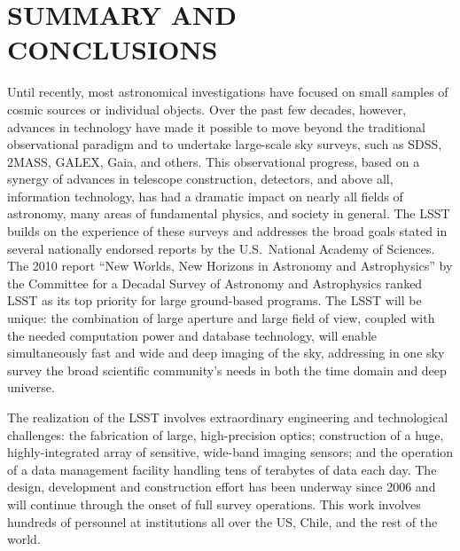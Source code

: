 \section{SUMMARY AND CONCLUSIONS}
\label{Sec:conclusions}

Until recently, most astronomical investigations have focused on small
samples of cosmic sources or individual objects. Over the past few decades,
however, advances in technology have made it possible to move beyond the
traditional observational paradigm and to undertake large-scale sky
surveys, such as SDSS, 2MASS, GALEX, Gaia, and others. This observational
progress, based on a synergy of advances in telescope construction, detectors,
and above all, information technology, has had a dramatic impact on nearly all
fields of astronomy, many areas of fundamental physics, and society in
general. The LSST builds on the experience of these surveys and addresses
the broad goals stated in several nationally endorsed reports by the U.S.\
National Academy of Sciences. The 2010 report ``New Worlds, New Horizons
in Astronomy and Astrophysics'' by the Committee for a Decadal Survey of Astronomy and
Astrophysics
ranked LSST as its top priority for large ground-based programs.
The LSST will be unique: the combination of large aperture and large field of view,
coupled with the needed computation power and database technology, will
enable simultaneously fast and wide and deep imaging of the sky, addressing in
one sky survey the broad scientific community's needs in both the
time domain and deep universe.

The realization of the LSST involves extraordinary engineering and
technological challenges: the fabrication of large, high-precision optics;
construction of a huge, highly-integrated array of sensitive, wide-band
imaging sensors; and the operation of a data management facility
handling tens of terabytes of data each day. The design, development
and construction
effort has been underway since 2006 and will continue through the
onset of full survey operations.  This work involves hundreds of
personnel at institutions all over the US, Chile, and the rest of the
world.

